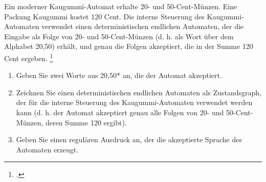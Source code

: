\documentclass{bschlangaul-aufgabe}
\begin{document}

Ein moderner Kaugummi-Automat erhalte 20- und 50-Cent-Münzen. Eine
Packung Kaugummi kostet 120 Cent. Die interne Steuerung des
Kaugummi-Automaten verwendet einen deterministischen endlichen
Automaten, der die Eingabe als Folge von 20- und 50-Cent-Münzen (d. h.
als Wort über dem Alphabet {20,50}) erhält, und genau die Folgen
akzeptiert, die in der Summe 120 Cent ergeben.
\footcite{examen:46115:2021:03}

\begin{enumerate}


\item Geben Sie zwei Worte aus {20,50}* an, die der Automat akzeptiert.


\item Zeichnen Sie einen deterministischen endlichen Automaten als
Zustandsgraph, der für die interne Steuerung des Kaugummi-Automaten
verwendet werden kann (d. h. der Automat akzeptiert genau alle Folgen
von 20- und 50-Cent-Münzen, deren Summe 120 ergibt).


\item Geben Sie einen regulären Ausdruck an, der die akzeptierte Sprache
des Automaten erzeugt.
\end{enumerate}
\end{document}
